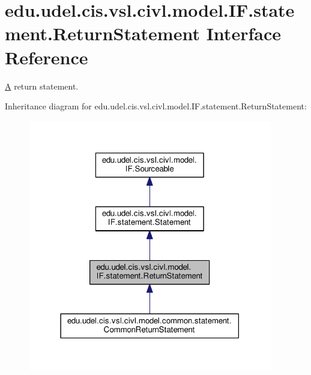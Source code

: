 \hypertarget{interfaceedu_1_1udel_1_1cis_1_1vsl_1_1civl_1_1model_1_1IF_1_1statement_1_1ReturnStatement}{}\section{edu.\+udel.\+cis.\+vsl.\+civl.\+model.\+I\+F.\+statement.\+Return\+Statement Interface Reference}
\label{interfaceedu_1_1udel_1_1cis_1_1vsl_1_1civl_1_1model_1_1IF_1_1statement_1_1ReturnStatement}


\hyperlink{structA}{A} return statement.  




Inheritance diagram for edu.\+udel.\+cis.\+vsl.\+civl.\+model.\+I\+F.\+statement.\+Return\+Statement\+:
\nopagebreak
\begin{figure}[H]
\begin{center}
\leavevmode
\includegraphics[width=302pt]{interfaceedu_1_1udel_1_1cis_1_1vsl_1_1civl_1_1model_1_1IF_1_1statement_1_1ReturnStatement__inherit__graph}
\end{center}
\end{figure}


